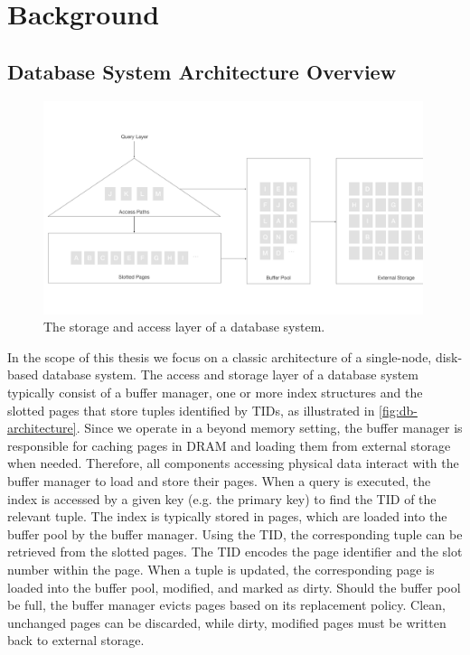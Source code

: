 \chapter{Background}

\section{Database System Architecture Overview}


\begin{figure}[htpb]
  \centering
  \includegraphics[width=0.99\textwidth]{figures/db_architecture.pdf}
  \caption{The storage and access layer of a database system.}
  \label{fig:db-architecture}
\end{figure}

In the scope of this thesis we focus on a classic architecture of a single-node, disk-based database system.
The access and storage layer of a database system typically consist of a buffer manager, one or more index structures and the slotted pages that store tuples identified by \ac{TID}s, as illustrated in \autoref{fig:db-architecture}.
Since we operate in a beyond memory setting, the buffer manager is responsible for caching pages in \ac{DRAM} and loading them from external storage when needed.
Therefore, all components accessing physical data interact with the buffer manager to load and store their pages.
When a query is executed, the index is accessed by a given key (e.g. the primary key) to find the \ac{TID} of the relevant tuple.
The index is typically stored in pages, which are loaded into the buffer pool by the buffer manager.
Using the \ac{TID}, the corresponding tuple can be retrieved from the slotted pages.
The \ac{TID} encodes the page identifier and the slot number within the page.
When a tuple is updated, the corresponding page is loaded into the buffer pool, modified, and marked as dirty.
Should the buffer pool be full, the buffer manager evicts pages based on its replacement policy.
Clean, unchanged pages can be discarded, while dirty, modified pages must be written back to external storage.


